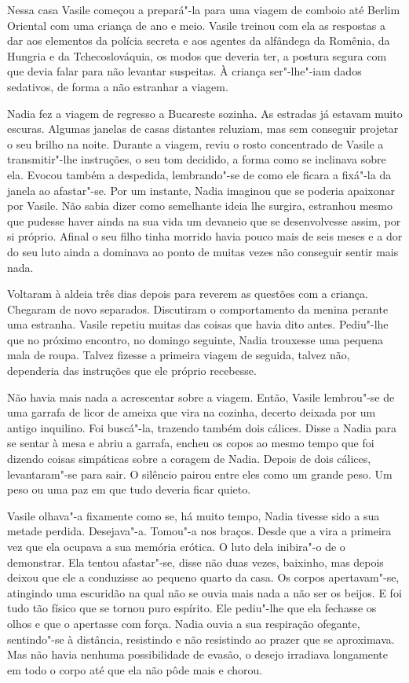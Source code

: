 Nessa casa Vasile começou a prepará"-la para uma viagem de comboio até
Berlim Oriental com uma criança de ano e meio. Vasile treinou com ela as
respostas a dar aos elementos da polícia secreta e aos agentes da
alfândega da Romênia, da Hungria e da Tchecoslováquia, os modos que
deveria ter, a postura segura com que devia falar para não levantar
suspeitas. À criança ser"-lhe"-iam dados sedativos, de forma a não
estranhar a viagem.

Nadia fez a viagem de regresso a Bucareste sozinha. As estradas já
estavam muito escuras. Algumas janelas de
casas distantes reluziam, mas sem conseguir projetar o seu brilho na
noite. Durante a viagem, reviu o rosto concentrado de Vasile a
transmitir"-lhe instruções, o seu tom decidido, a forma como se inclinava
sobre ela. Evocou também a despedida, lembrando"-se de como ele ficara a
fixá"-la da janela ao afastar"-se. Por um instante, Nadia imaginou que
se poderia apaixonar por Vasile. Não sabia dizer como semelhante ideia
lhe surgira, estranhou mesmo que pudesse haver ainda na sua vida um
devaneio que se desenvolvesse assim, por si próprio. Afinal o seu
filho tinha morrido havia pouco mais de seis meses e a dor do seu luto
ainda a dominava ao ponto de muitas vezes não conseguir sentir mais
nada.

Voltaram à aldeia três dias depois para reverem as questões com a
criança. Chegaram de novo separados. Discutiram o comportamento da
menina perante uma estranha. Vasile repetiu muitas das coisas que havia
dito antes. Pediu"-lhe que no próximo encontro, no domingo seguinte,
Nadia trouxesse uma pequena mala de roupa. Talvez fizesse a primeira
viagem de seguida, talvez não, dependeria das instruções que ele
próprio recebesse.

Não havia mais nada a acrescentar sobre a viagem. Então, Vasile
lembrou"-se de uma garrafa de licor de ameixa que vira na cozinha,
decerto deixada por um antigo inquilino. Foi buscá"-la, trazendo também
dois cálices. Disse a Nadia para se sentar à mesa e abriu a garrafa,
encheu os copos ao mesmo tempo que foi dizendo coisas simpáticas sobre a
coragem de Nadia. Depois de dois cálices, levantaram"-se para sair. O
silêncio pairou entre eles como um grande peso. Um peso ou uma paz em
que tudo deveria ficar quieto.

Vasile olhava"-a fixamente como se, há muito tempo, Nadia tivesse sido a
sua metade perdida. Desejava"-a. Tomou"-a nos braços. Desde que a vira a
primeira vez que ela ocupava a sua memória erótica. O luto dela
inibira"-o de o demonstrar. Ela tentou afastar"-se, disse não duas vezes,
baixinho, mas depois deixou que ele a conduzisse ao pequeno quarto da
casa. Os corpos apertavam"-se, atingindo uma escuridão na qual não se
ouvia mais nada a não ser os beijos. E foi tudo tão físico que se tornou
puro espírito. Ele pediu"-lhe que ela fechasse os olhos e que o apertasse com força. Nadia ouvia a sua respiração ofegante, sentindo"-se à
distância, resistindo e não resistindo ao prazer que se aproximava. Mas
não havia nenhuma possibilidade de evasão, o desejo irradiava longamente
em todo o corpo até que ela não pôde mais e chorou.

